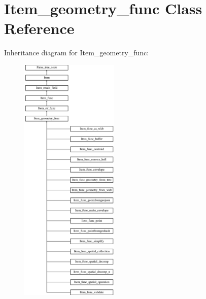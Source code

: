 \hypertarget{classItem__geometry__func}{}\section{Item\+\_\+geometry\+\_\+func Class Reference}
\label{classItem__geometry__func}
Inheritance diagram for Item\+\_\+geometry\+\_\+func\+:\begin{figure}[H]
\begin{center}
\leavevmode
\includegraphics[height=12.000000cm]{classItem__geometry__func}
\end{center}
\end{figure}
